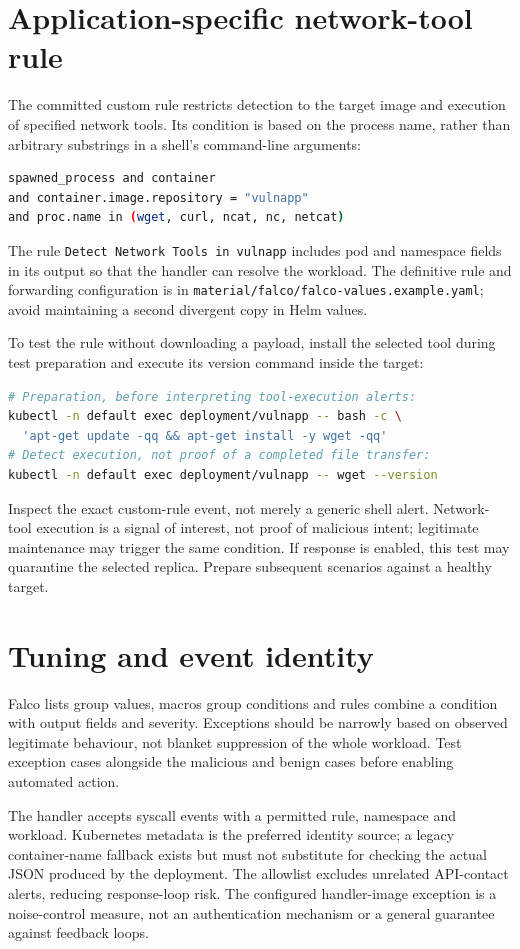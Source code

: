 \section{Application-specific network-tool rule}
The committed custom rule restricts detection to the target image and execution of
specified network tools. Its condition is based on the process name, rather than
arbitrary substrings in a shell's command-line arguments:
\begin{lstlisting}[language=bash]
spawned_process and container
and container.image.repository = "vulnapp"
and proc.name in (wget, curl, ncat, nc, netcat)
\end{lstlisting}
The rule \texttt{Detect Network Tools in vulnapp} includes pod and namespace fields
in its output so that the handler can resolve the workload. The definitive rule and
forwarding configuration is in \texttt{material/falco/falco-values.example.yaml};
avoid maintaining a second divergent copy in Helm values.

To test the rule without downloading a payload, install the selected tool during
test preparation and execute its version command inside the target:
\begin{lstlisting}[language=bash]
# Preparation, before interpreting tool-execution alerts:
kubectl -n default exec deployment/vulnapp -- bash -c \
  'apt-get update -qq && apt-get install -y wget -qq'
# Detect execution, not proof of a completed file transfer:
kubectl -n default exec deployment/vulnapp -- wget --version
\end{lstlisting}
Inspect the exact custom-rule event, not merely a generic shell alert. Network-tool
execution is a signal of interest, not proof of malicious intent; legitimate maintenance
may trigger the same condition. If response is enabled, this test may quarantine the
selected replica. Prepare subsequent scenarios against a healthy target.

\section{Tuning and event identity}
Falco lists group values, macros group conditions and rules combine a condition with
output fields and severity. Exceptions should be narrowly based on observed legitimate
behaviour, not blanket suppression of the whole workload. Test exception cases alongside
the malicious and benign cases before enabling automated action.

The handler accepts syscall events with a permitted rule, namespace and workload.
Kubernetes metadata is the preferred identity source; a legacy container-name fallback
exists but must not substitute for checking the actual JSON produced by the deployment.
The allowlist excludes unrelated API-contact alerts, reducing response-loop risk.
The configured handler-image exception is a noise-control measure, not an authentication
mechanism or a general guarantee against feedback loops.
